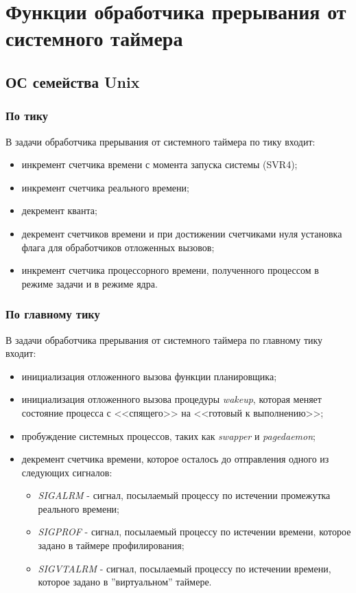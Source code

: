 \chapter{Функции обработчика прерывания от системного таймера}

\section{ОС семейства Unix}

\subsection{По тику}

В задачи обработчика прерывания от системного таймера по тику входит:

\begin{itemize}
	\item инкремент счетчика времени с момента запуска системы (SVR4);
	\item инкремент счетчика реального времени;
	\item декремент кванта;
	\item декремент счетчиков времени и при достижении счетчиками нуля установка флага для обработчиков отложенных вызовов;
	\item инкремент счетчика процессорного времени, полученного процессом в режиме задачи и в режиме ядра.
\end{itemize}

\subsection{По главному тику}

В задачи обработчика прерывания от системного таймера по главному тику входит:

\begin{itemize}
	\item инициализация отложенного вызова функции планировщика;
	\item инициализация отложенного вызова процедуры \textit{wakeup}, которая меняет состояние процесса с <<спящего>> на <<готовый к выполнению>>;
	\item пробуждение системных процессов, таких как \textit{swapper} и \textit{pagedaemon};
	\item декремент счетчика времени, которое осталось до отправления одного из следующих сигналов:
	\begin{itemize}
		\item \textit{SIGALRM} - сигнал, посылаемый процессу по истечении промежутка реального времени;
		\item \textit{SIGPROF} - сигнал, посылаемый процессу по истечении времени, которое задано в таймере профилирования;
		\item \textit{SIGVTALRM} - сигнал, посылаемый процессу по истечении времени, которое задано в ''виртуальном'' таймере.
	\end{itemize}
\end{itemize}

